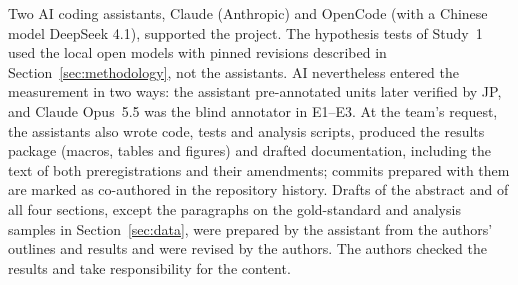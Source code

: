 \documentclass[10pt,a4paper]{article}
\begin{document}
Two AI coding assistants, Claude (Anthropic) and OpenCode (with a Chinese model DeepSeek 4.1), supported the
project. The hypothesis tests of Study~1 used the local open models with pinned revisions
described in Section~\ref{sec:methodology}, not the assistants. AI nevertheless entered the
measurement in two ways: the assistant pre-annotated units later verified by JP, and Claude
Opus~5.5 was the blind annotator in E1--E3. At the team's request, the
assistants also wrote code, tests and analysis scripts, produced the results package (macros,
tables and figures) and drafted documentation, including the text of both preregistrations
and their amendments; commits prepared with them are marked as co-authored in the
repository history.
Drafts of the abstract and of all four sections, except the paragraphs on the gold-standard
and analysis samples in Section~\ref{sec:data}, were prepared by the assistant from the
authors' outlines and results and were revised by the authors.
The authors checked the results and take responsibility for the content.

\end{document}
